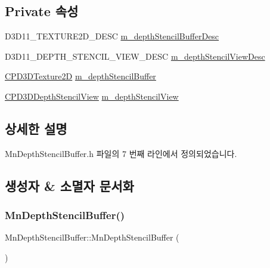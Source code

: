 \subsection*{Private 속성}
\begin{DoxyCompactItemize}
\item 
D3\+D11\+\_\+\+T\+E\+X\+T\+U\+R\+E2\+D\+\_\+\+D\+E\+SC \hyperlink{class_m_n_l_1_1_mn_depth_stencil_buffer_a35c7153f9064c5d503391b546fe41437}{m\+\_\+depth\+Stencil\+Buffer\+Desc}
\item 
D3\+D11\+\_\+\+D\+E\+P\+T\+H\+\_\+\+S\+T\+E\+N\+C\+I\+L\+\_\+\+V\+I\+E\+W\+\_\+\+D\+E\+SC \hyperlink{class_m_n_l_1_1_mn_depth_stencil_buffer_a30ce2c7cebdd1db6c6a08ae22d7f9269}{m\+\_\+depth\+Stencil\+View\+Desc}
\item 
\hyperlink{namespace_m_n_l_addb538e1cbd1f443e6db5e6312487c51}{C\+P\+D3\+D\+Texture2D} \hyperlink{class_m_n_l_1_1_mn_depth_stencil_buffer_ae995fe33e73c061329841ca2e1fd1c0d}{m\+\_\+depth\+Stencil\+Buffer}
\item 
\hyperlink{namespace_m_n_l_a12b3c209d76ede855300e637f4192a04}{C\+P\+D3\+D\+Depth\+Stencil\+View} \hyperlink{class_m_n_l_1_1_mn_depth_stencil_buffer_a0be4d4b37417df8478e891b471bdd270}{m\+\_\+depth\+Stencil\+View}
\end{DoxyCompactItemize}


\subsection{상세한 설명}


Mn\+Depth\+Stencil\+Buffer.\+h 파일의 7 번째 라인에서 정의되었습니다.



\subsection{생성자 \& 소멸자 문서화}
\mbox{\label{class_m_n_l_1_1_mn_depth_stencil_buffer_a62c99b992fdd488bbcedee12e377e09f}} 
\subsubsection{\texorpdfstring{Mn\+Depth\+Stencil\+Buffer()}{MnDepthStencilBuffer()}}
{\footnotesize\ttfamily Mn\+Depth\+Stencil\+Buffer\+::\+Mn\+Depth\+Stencil\+Buffer (\begin{DoxyParamCaption}{ }\end{DoxyParamCaption})}




